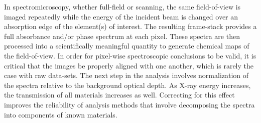 \documentclass[journal=cmatex,manuscript=perspective]{achemso}
\begin{document}
In spectromicroscopy, whether full-field or scanning, the same
field-of-view is imaged repeatedly while the energy of the incident
beam is changed over an absorption edge of the element(s) of
interest. The resulting frame-stack provides a full absorbance and/or
phase spectrum at each pixel. These spectra are then processed into a
scientifically meaningful quantity to generate chemical maps of the
field-of-view. In order for pixel-wise spectroscopic conclusions to be
valid, it is critical that the images be properly aligned with one
another, which is rarely the case with raw data-sets.  The next step
in the analysis involves normalization of the spectra relative to the
background optical depth. As X-ray energy increases, the transmission
of all materials increases as well. Correcting for this effect
improves the reliability of analysis methods that involve decomposing
the spectra into components of known materials\cite{jin2015}.
\end{document}
